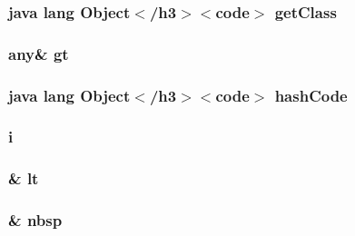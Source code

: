 \hypertarget{_login_activity_8html_a98e6644727fe65eac217a6855045be43}{
\subsubsection[{get\-Class}]{\setlength{\rightskip}{0pt plus 5cm}java lang Object$<$/h3$>$$<$code$>$ get\-Class}}\label{_login_activity_8html_a98e6644727fe65eac217a6855045be43}
\hypertarget{_login_activity_8html_a1bb4447113f0bd7bf49e2b3dee2e065d}{
\subsubsection[{gt}]{\setlength{\rightskip}{0pt plus 5cm}any\& gt}}\label{_login_activity_8html_a1bb4447113f0bd7bf49e2b3dee2e065d}
\hypertarget{_login_activity_8html_a8e178e2bb2bef055ea23ea3910a221ca}{
\subsubsection[{hash\-Code}]{\setlength{\rightskip}{0pt plus 5cm}java lang Object$<$/h3$>$$<$code$>$ hash\-Code}}\label{_login_activity_8html_a8e178e2bb2bef055ea23ea3910a221ca}
\hypertarget{_login_activity_8html_a7e98b8a17c0aad30ba64d47b74e2a6c1}{
\subsubsection[{i}]{\setlength{\rightskip}{0pt plus 5cm}i}}\label{_login_activity_8html_a7e98b8a17c0aad30ba64d47b74e2a6c1}
\hypertarget{_login_activity_8html_a857c8c8ca640fb2283d751a715bd1ee9}{
\subsubsection[{lt}]{\setlength{\rightskip}{0pt plus 5cm}\& lt}}\label{_login_activity_8html_a857c8c8ca640fb2283d751a715bd1ee9}
\hypertarget{_login_activity_8html_aef915316f784c9063d942974538301a6}{
\subsubsection[{nbsp}]{\setlength{\rightskip}{0pt plus 5cm}\& nbsp}}\label{_login_activity_8html_aef915316f784c9063d942974538301a6}
